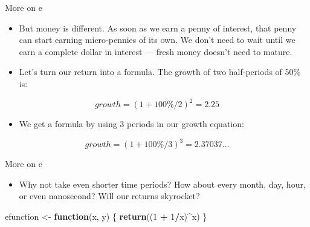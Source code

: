 \documentclass[
  ignorenonframetext,
]{beamer}
\newenvironment{Shaded}{\begin{snugshade}}{\end{snugshade}}
\newcommand{\ControlFlowTok}[1]{\textcolor[rgb]{0.13,0.29,0.53}{\textbf{#1}}}
\newcommand{\DecValTok}[1]{\textcolor[rgb]{0.00,0.00,0.81}{#1}}
\newcommand{\KeywordTok}[1]{\textcolor[rgb]{0.13,0.29,0.53}{\textbf{#1}}}
\newcommand{\NormalTok}[1]{#1}
\newcommand{\OperatorTok}[1]{\textcolor[rgb]{0.81,0.36,0.00}{\textbf{#1}}}
\newcommand{\StringTok}[1]{\textcolor[rgb]{0.31,0.60,0.02}{#1}}
\providecommand{\tightlist}{%
  \setlength{\itemsep}{0pt}\setlength{\parskip}{0pt}}
\begin{document}
\begin{frame}{More on e}
\protect\hypertarget{more-on-e-2}{}

\begin{itemize}
\item
  But money is different. As soon as we earn a penny of interest, that
  penny can start earning micro-pennies of its own. We don't need to
  wait until we earn a complete dollar in interest --- fresh money
  doesn't need to mature.
\item
  Let's turn our return into a formula. The growth of two half-periods
  of 50\% is:
\end{itemize}

\[\displaystyle{growth = (1 + 100\%/2)^{2} = 2.25}\]

\begin{itemize}
\tightlist
\item
  We get a formula by using 3 periods in our growth equation:
\end{itemize}

\[\displaystyle{growth = (1 + 100\%/3)^3 = 2.37037...}\]

\end{frame}

\begin{frame}[fragile]{More on e}
\protect\hypertarget{more-on-e-3}{}

\begin{itemize}
\tightlist
\item
  Why not take even shorter time periods? How about every month, day,
  hour, or even nanosecond? Will our returns skyrocket?
\end{itemize}

\begin{Shaded}
\begin{Highlighting}[]
\NormalTok{efunction <-}\StringTok{ }\ControlFlowTok{function}\NormalTok{(x, y) \{}
\KeywordTok{return}\NormalTok{((}\DecValTok{1} \OperatorTok{+}\StringTok{ }\DecValTok{1}\OperatorTok{/}\NormalTok{x)}\OperatorTok{^}\NormalTok{x)}
\NormalTok{\}}
\end{Highlighting}
\end{Shaded}

\end{frame}
\end{document}
